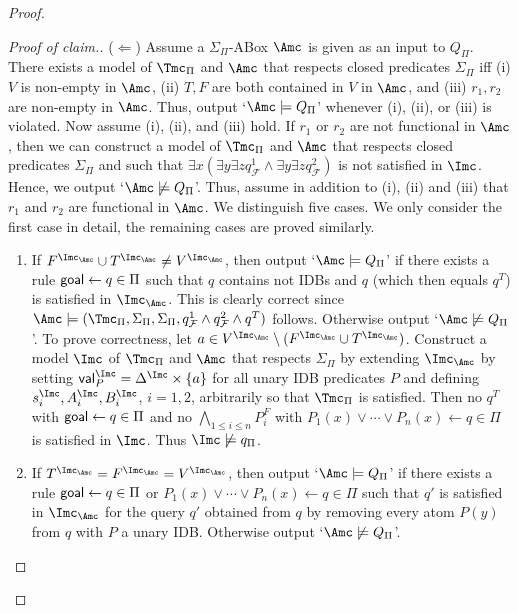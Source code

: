 \documentclass{lmcs}
\theoremstyle{definition}
\let\OriginalQedSymbol\qedsymbol
\renewcommand{\qedsymbol}{\OriginalQedSymbol\setcounter{claim}{0}}
\let\NormalQedSymbol\qedsymbol
\newenvironment{clmproof}[1]{\renewcommand{\qedsymbol}{$\dashv$}\begin{proof}[Proof of claim.]\space#1}{\end{proof}\renewcommand{\qedsymbol}{\NormalQedSymbol}}
\begin{document}
\begin{proof}
\begin{clmproof}
\medskip
\noindent
($\Leftarrow$) Assume a $\Sigma_{\Pi}$-ABox $\Amc$ is given as an
input to $Q_\Pi$. There exists a model of $\Tmc_{\Pi}$ and $\Amc$ that
respects closed predicates $\Sigma_{\Pi}$ iff (i) $V$ is
non-empty in $\Amc$, (ii) $T,F$ are both contained
in $V$ in $\Amc$, and (iii) $r_{1},r_{2}$ are
non-empty in $\Amc$. Thus, output `$\Amc\models Q_{\Pi}$' whenever (i),
(ii), or (iii) is violated.  Now assume (i), (ii), and (iii) hold.  If
$r_{1}$ or $r_{2}$ are not functional in $\Amc$, then we can construct a model of $\Tmc_{\Pi}$ and $\Amc$ that respects
closed predicates $\Sigma_{\Pi}$ and such that $\exists x (\exists y\exists z q_{\mathcal{F}}^{1} \wedge \exists y \exists z
q_{\mathcal{F}}^{2})$ is not satisfied in $\Imc$. Hence, we output `$\Amc\not\models Q_{\Pi}$'.
Thus, assume in addition to (i), (ii) and (iii) that $r_{1}$ and $r_{2}$ are functional in $\Amc$. 
We distinguish five cases.
We only consider the first case in detail, the remaining cases are proved similarly.
\begin{enumerate}
\item If $F^{\Imc_{\Amc}}\cup T^{\Imc_{\Amc}}\not=V^{\Imc_{\Amc}}$, then output `$\Amc\models Q_{\Pi}$' if there exists a rule ${\sf goal}\leftarrow q\in \Pi$ such that
$q$ contains not IDBs and $q$ (which then equals $q^{T}$) is satisfied in $\Imc_{\Amc}$.
This is clearly correct since $\Amc\models (\Tmc_{\Pi},\Sigma_{\Pi},\Sigma_{\Pi},q_{\mathcal{F}}^{1}\wedge q_{\mathcal{F}}^{2}\wedge q^{T})$ 
follows. 
Otherwise output `$\Amc\not\models Q_{\Pi}$'. To prove correctness, let $a\in
V^{\Imc_{\Amc}}\setminus (F^{\Imc_{\Amc}}\cup T^{\Imc_{\Amc}})$. Construct a model $\Imc$ of $\Tmc_{\Pi}$ and $\Amc$ that respects $\Sigma_{\Pi}$ 
by extending $\Imc_{\Amc}$ by setting ${\sf val}_{P}^{\Imc}= \Delta^{\Imc}\times \{a\}$ for all unary IDB predicates $P$
and defining $s_{i}^{\Imc},A_{i}^{\Imc},B_{i}^{\Imc}$, $i=1,2$, arbitrarily so that $\Tmc_{\Pi}$ is satisfied. 
Then no $q^{T}$ with ${\sf goal}\leftarrow q\in \Pi$ and no 
$\bigwedge_{1\leq i \leq n} P_{i}^{F}$ with $P_{1}(x)\vee \cdots \vee P_{n}(x) \leftarrow q\in \Pi$ is satisfied in $\Imc$.
Thus $\Imc\not\models q_{\Pi}$.
\item If $T^{\Imc_{\Amc}}=F^{\Imc_{\Amc}}=V^{\Imc_{\Amc}}$, then output `$\Amc\models Q_{\Pi}$' if there exists a rule ${\sf goal}\leftarrow q\in \Pi$ 
or $P_{1}(x)\vee \cdots \vee P_{n}(x) \leftarrow q\in \Pi$ such that $q'$ is satisfied in $\Imc_{\Amc}$ for the query $q'$ obtained from 
$q$ by removing every atom $P(y)$ from $q$ with $P$ a unary IDB. Otherwise output `$\Amc\not\models Q_{\Pi}$'. 

\end{enumerate}
\end{clmproof}
\end{proof}
\end{document}
